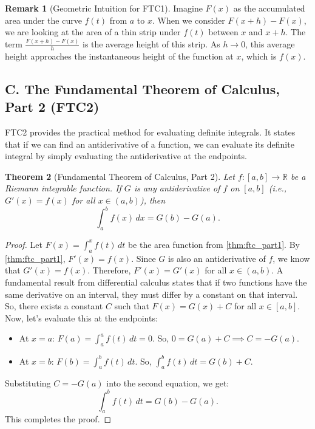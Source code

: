 \documentclass[11pt, a4paper]{article}
\theoremstyle{plain} %
\newtheorem{theorem}{Theorem}[section] %
\theoremstyle{definition} %
\newtheorem{remark}[theorem]{Remark}
\theoremstyle{remark} %
\begin{document}
\begin{remark}[Geometric Intuition for FTC1]
    Imagine \( F(x) \) as the accumulated area under the curve \( f(t) \) from \( a \) to \( x \). When we consider \( F(x+h) - F(x) \), we are looking at the area of a thin strip under \( f(t) \) between \( x \) and \( x+h \). The term \( \frac{F(x+h) - F(x)}{h} \) is the average height of this strip. As \( h \to 0 \), this average height approaches the instantaneous height of the function at \( x \), which is \( f(x) \).
\end{remark}

\subsection{C. The Fundamental Theorem of Calculus, Part 2 (FTC2)}

FTC2 provides the practical method for evaluating definite integrals. It states that if we can find an antiderivative of a function, we can evaluate its definite integral by simply evaluating the antiderivative at the endpoints.

\begin{theorem}[Fundamental Theorem of Calculus, Part 2]
    \label{thm:ftc_part2}
    Let \( f: [a,b] \to \mathbb{R} \) be a Riemann integrable function. If \( G \) is any antiderivative of \( f \) on \( [a,b] \) (i.e., \( G'(x) = f(x) \) for all \( x \in (a,b) \)), then
    \[ \int_a^b f(x) \, dx = G(b) - G(a). \]
\end{theorem}

\begin{proof}
    Let \( F(x) = \int_a^x f(t) \, dt \) be the area function from \ref{thm:ftc_part1}. By \ref{thm:ftc_part1}, \( F'(x) = f(x) \).
    Since \( G \) is also an antiderivative of \( f \), we know that \( G'(x) = f(x) \).
    Therefore, \( F'(x) = G'(x) \) for all \( x \in (a,b) \).
    A fundamental result from differential calculus states that if two functions have the same derivative on an interval, they must differ by a constant on that interval. So, there exists a constant \( C \) such that \( F(x) = G(x) + C \) for all \( x \in [a,b] \).
    Now, let's evaluate this at the endpoints:
    \begin{itemize}
        \item At \( x=a \): \( F(a) = \int_a^a f(t) \, dt = 0 \). So, \( 0 = G(a) + C \implies C = -G(a) \).
        \item At \( x=b \): \( F(b) = \int_a^b f(t) \, dt \). So, \( \int_a^b f(t) \, dt = G(b) + C \).
    \end{itemize}
    Substituting \( C = -G(a) \) into the second equation, we get:
    \[ \int_a^b f(t) \, dt = G(b) - G(a). \]
    This completes the proof.
\end{proof}
\end{document}
